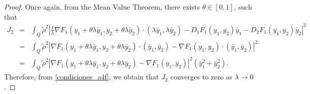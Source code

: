 \documentclass[10pt,a4paper]{amsart}
\begin{document}
\begin{proof}
    \noindent Once again, from the Mean Value Theorem, there exists 
    $\theta \in [0,1]$, such that
    \begin{eqnarray*}
    	J_2&=&\int_Q \tilde\rho^2 \left| \frac{1}{\lambda} \nabla F_1(y_1+\theta\lambda\bar y_1,y_2+\theta\lambda\bar y_2)\cdot (\lambda \bar y_1,\lambda \bar y_2) - D_1 F_1(y_1,y_2)\bar y_1 - D_2 F_1(y_1,y_2)\bar y_2 \right|^2\\
        &=& \int_Q \tilde\rho^2 \left| \nabla F_1(y_1+\theta\lambda\bar y_1,y_2+\theta\lambda\bar y_2)\cdot (\bar y_1,\bar y_2) - \nabla F_1(y_1,y_2) \cdot (\bar y_1,\bar y_2) \right|^2\\
        &=& \int_Q \tilde\rho^2 \left| \nabla F_1(y_1+\theta\lambda\bar y_1,y_2+\theta\lambda\bar y_2) - \nabla F_1(y_1,y_2) \right|^2 (\bar y_1^2 + \bar y_2^2 ).
    \end{eqnarray*}
    Therefore, from \eqref{condiciones_a4f}, we obtain that $J_2$ converges to zero as $\lambda \to 0$. 
    

\end{proof}
\end{document}

